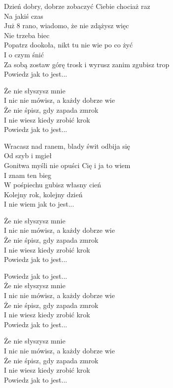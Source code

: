 \begin{text}
    Dzień dobry, dobrze zobaczyć Ciebie chociaż raz\\
    Na jakiś czas\\
    Już 8 rano, wiadomo, że nie zdążysz więc\\
    Nie trzeba biec\\
    Popatrz dookoła, nikt tu nie wie po co żyć\\
    I o czym śnić\\
    Za sobą zostaw górę trosk i wyrusz zanim zgubisz trop\\
    Powiedz jak to jest...

    Że nie słyszysz mnie\\
    I nic nie mówisz, a każdy dobrze wie\\
    Że nie śpisz, gdy zapada zmrok\\
    I nie wiesz kiedy zrobić krok\\
    Powiedz jak to jest...

    Wracasz nad ranem, blady świt odbija się\\
    Od szyb i mgieł\\
    Gonitwa myśli nie opuści Cię i ja to wiem\\
    I znam ten bieg\\
    W pośpiechu gubisz własny cień\\
    Kolejny rok, kolejny dzień\\
    I nie wiem jak to jest...

    Że nie słyszysz mnie\\
    I nic nie mówisz, a każdy dobrze wie\\
    Że nie śpisz, gdy zapada zmrok\\
    I nie wiesz kiedy zrobić krok\\
    Powiedz jak to jest...

    Powiedz jak to jest...\\
    Że nie słyszysz mnie\\
    I nic nie mówisz, a każdy dobrze wie\\
    Że nie śpisz, gdy zapada zmrok\\
    I nie wiesz kiedy zrobić krok\\
    Powiedz jak to jest...

    Że nie słyszysz mnie\\
    I nic nie mówisz, a każdy dobrze wie\\
    Że nie śpisz, gdy zapada zmrok\\
    I nie wiesz kiedy zrobić krok\\
    Powiedz jak to jest...
\end{text}
\begin{chord}

\end{chord}
